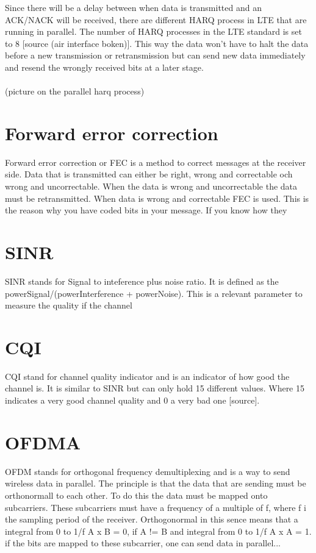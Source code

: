 \documentclass[cropmarks, frame, english]{idamasterthesis}
\begin{document}
Since there will be a delay between when data is transmitted and an ACK/NACK will be received, there are different HARQ process in LTE that are running in parallel. The number of HARQ processes in the LTE standard is set to 8 [source (air interface boken)]. This way the data won't have to halt the data before a new transmission or retransmission but can send new data immediately and resend the wrongly received bits at a later stage.
\\
\\
(picture on the parallel harq process)
\\


\section{Forward error correction}
Forward error correction or FEC is a method to correct messages at the receiver side. Data that is transmitted can either be right, wrong and correctable och wrong and uncorrectable. When the data is wrong and uncorrectable the data must be retransmitted. When data is wrong and correctable FEC is used. This is the reason why you have coded bits in your message. If you know how they

\section{SINR}
SINR stands for Signal to inteference plus noise ratio. It is defined as the powerSignal/(powerInterference + powerNoise). This is a relevant parameter to measure the quality if the channel

\section{CQI}
CQI stand for channel quality indicator and is an indicator of how good the channel is. It is similar to SINR but can only hold 15 different values. Where 15 indicates a very good channel quality and 0 a very bad one [source].


\section{OFDMA}
OFDM stands for orthogonal frequency demultiplexing and is a way to send wireless data in parallel. The principle is that the data that are sending must be orthonormall to each other. To do this the data must be mapped onto subcarriers. These subcarriers must have a frequency of a multiple of f, where f i the sampling period of the receiver. Orthogonormal in this sence means that a integral from 0 to 1/f A x B = 0, if A != B and integral from 0 to 1/f A x A = 1.
if the bits are mapped to these subcarrier, one can send data in parallel...
\end{document}
